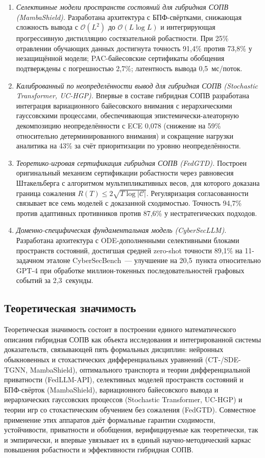 \documentclass[12pt,a5paper]{article}
\begin{document}
\begin{enumerate}
\item \textit{Селективные модели пространств состояний для
гибридная СОПВ (MambaShield).} Разработана архитектура с
БПФ-свёртками, снижающая сложность вывода с $\mathcal{O}(L^2)$
до $\mathcal{O}(L\log L)$ и интегрирующая прогрессивную
дистилляцию состязательной робастности. При 25\% отравлении
обучающих данных достигнута точность 91,4\% против 73,8\% у
незащищённой модели; PAC-байесовские сертификаты обобщения
подтверждены с погрешностью 2,7\%; латентность вывода
0,5~мс/поток.

\item \textit{Калиброванный по неопределённости вывод для
гибридная СОПВ (Stochastic Transformer, UC-HGP).} Впервые в составе
гибридная СОПВ разработана интеграция вариационного байесовского
внимания с иерархическими гауссовскими процессами, обеспечивающая
эпистемически-алеаторную декомпозицию неопределённости с ECE
0,078 (снижение на 59\% относительно детерминированного
внимания) и сокращение нагрузки аналитика на 43\% за счёт
приоритизации по уровню неопределённости.

\item \textit{Теоретико-игровая сертификация гибридная СОПВ
(FedGTD).} Построен оригинальный механизм сертификации
робастности через равновесия Штакельберга с алгоритмом
мультипликативных весов, для которого доказана граница
сожаления $R(T)\le 2\sqrt{T\log|\mathcal{C}|}$. Регуляризация
согласованности связывает все семь моделей с доказанной
сходимостью. Точность 94,7\% против адаптивных противников
против 87,6\% у нестратегических подходов.

\item \textit{Доменно-специфическая фундаментальная модель
(CyberSecLLM).} Разработана архитектура с ODE-дополненными
селективными блоками пространств состояний, достигшая средней
zero-shot точности 89,1\% на 11-задачном эталоне CyberSecBench~---
улучшение на 20,5~пункта относительно GPT-4 при обработке
миллион-токенных последовательностей графовых событий за
2,3~секунды.
\end{enumerate}

\subsection*{Теоретическая значимость}

Теоретическая значимость состоит в построении единого
математического описания гибридная СОПВ как объекта исследования
и интегрированной системы доказательств, связывающей пять
формальных дисциплин: нейронных обыкновенных и стохастических
дифференциальных уравнений (CT-/SDE-TGNN, MambaShield),
оптимального транспорта и теории дифференциальной приватности
(FedLLM-API), селективных моделей пространств состояний и
БПФ-свёрток (MambaShield), вариационного байесовского вывода
и иерархических гауссовских процессов (Stochastic Transformer,
UC-HGP) и теории игр со стохастическим обучением без сожаления
(FedGTD). Совместное применение этих аппаратов даёт формальные
гарантии сходимости, устойчивости, приватности и обобщения,
верифицируемые как теоретически, так и эмпирически, и
впервые увязывает их в единый научно-методический каркас
повышения робастности и эффективности гибридная СОПВ.
\end{document}
